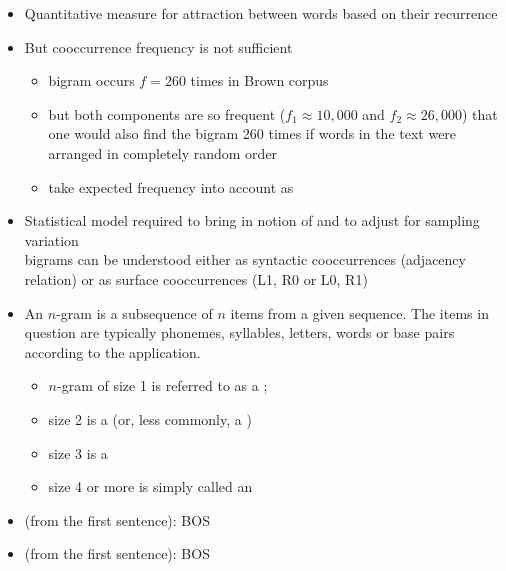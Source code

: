 \documentclass[a4paper,landscape,headrule,footrule,xetex]{foils}
\begin{document}
\begin{itemize}
\item Quantitative measure for attraction between words based
on their recurrence \into {}
\item 
But cooccurrence frequency is not sufficient
\begin{itemize}
\item bigram  occurs $f = 260$ times in Brown corpus
\item but both components are so frequent ($f_1 \approx   10,000$ and
$f_2 \approx   26,000$) that one would also find the bigram 260 times if
words in the text were arranged in completely random order

\item take expected frequency into account as 
\end{itemize}
\item 
Statistical model required to bring in notion of  and to adjust for sampling variation
\\ bigrams can be understood either as syntactic
cooccurrences (adjacency relation) or as surface
cooccurrences (L1, R0 or L0, R1)
\end{itemize}

\begin{itemize}
\item An $n$-gram is a subsequence of $n$ items from a given
  sequence. The items in question are typically phonemes, syllables, letters,
  words or base pairs according to the application.
  \begin{itemize}
  \item $n$-gram of size 1 is referred to as a ;
  \item size 2 is a  (or, less commonly, a )
  \item size 3 is a 
  \item size 4 or more is simply called an 
\end{itemize}
\item {} (from the first sentence):
BOS 
\item {} (from the first sentence):
BOS 
\end{itemize}
\end{document}
